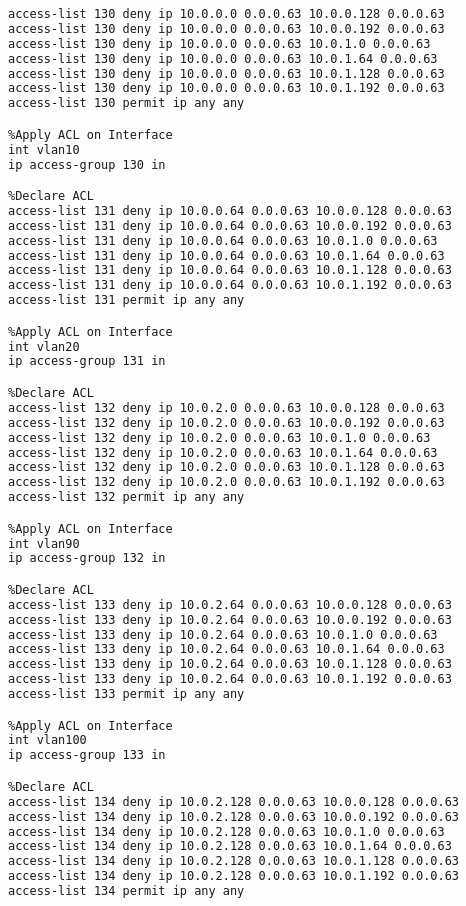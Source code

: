 \begin{lstlisting}[language=Bash, caption={Configuración ACLs Switches Distribución}]
%Declare ACL
access-list 130 deny ip 10.0.0.0 0.0.0.63 10.0.0.128 0.0.0.63
access-list 130 deny ip 10.0.0.0 0.0.0.63 10.0.0.192 0.0.0.63
access-list 130 deny ip 10.0.0.0 0.0.0.63 10.0.1.0 0.0.0.63
access-list 130 deny ip 10.0.0.0 0.0.0.63 10.0.1.64 0.0.0.63
access-list 130 deny ip 10.0.0.0 0.0.0.63 10.0.1.128 0.0.0.63
access-list 130 deny ip 10.0.0.0 0.0.0.63 10.0.1.192 0.0.0.63
access-list 130 permit ip any any

%Apply ACL on Interface
int vlan10
ip access-group 130 in

%Declare ACL
access-list 131 deny ip 10.0.0.64 0.0.0.63 10.0.0.128 0.0.0.63
access-list 131 deny ip 10.0.0.64 0.0.0.63 10.0.0.192 0.0.0.63
access-list 131 deny ip 10.0.0.64 0.0.0.63 10.0.1.0 0.0.0.63
access-list 131 deny ip 10.0.0.64 0.0.0.63 10.0.1.64 0.0.0.63
access-list 131 deny ip 10.0.0.64 0.0.0.63 10.0.1.128 0.0.0.63
access-list 131 deny ip 10.0.0.64 0.0.0.63 10.0.1.192 0.0.0.63
access-list 131 permit ip any any

%Apply ACL on Interface
int vlan20
ip access-group 131 in

%Declare ACL
access-list 132 deny ip 10.0.2.0 0.0.0.63 10.0.0.128 0.0.0.63
access-list 132 deny ip 10.0.2.0 0.0.0.63 10.0.0.192 0.0.0.63
access-list 132 deny ip 10.0.2.0 0.0.0.63 10.0.1.0 0.0.0.63
access-list 132 deny ip 10.0.2.0 0.0.0.63 10.0.1.64 0.0.0.63
access-list 132 deny ip 10.0.2.0 0.0.0.63 10.0.1.128 0.0.0.63
access-list 132 deny ip 10.0.2.0 0.0.0.63 10.0.1.192 0.0.0.63
access-list 132 permit ip any any

%Apply ACL on Interface
int vlan90
ip access-group 132 in

%Declare ACL
access-list 133 deny ip 10.0.2.64 0.0.0.63 10.0.0.128 0.0.0.63
access-list 133 deny ip 10.0.2.64 0.0.0.63 10.0.0.192 0.0.0.63
access-list 133 deny ip 10.0.2.64 0.0.0.63 10.0.1.0 0.0.0.63
access-list 133 deny ip 10.0.2.64 0.0.0.63 10.0.1.64 0.0.0.63
access-list 133 deny ip 10.0.2.64 0.0.0.63 10.0.1.128 0.0.0.63
access-list 133 deny ip 10.0.2.64 0.0.0.63 10.0.1.192 0.0.0.63
access-list 133 permit ip any any

%Apply ACL on Interface
int vlan100
ip access-group 133 in

%Declare ACL
access-list 134 deny ip 10.0.2.128 0.0.0.63 10.0.0.128 0.0.0.63
access-list 134 deny ip 10.0.2.128 0.0.0.63 10.0.0.192 0.0.0.63
access-list 134 deny ip 10.0.2.128 0.0.0.63 10.0.1.0 0.0.0.63
access-list 134 deny ip 10.0.2.128 0.0.0.63 10.0.1.64 0.0.0.63
access-list 134 deny ip 10.0.2.128 0.0.0.63 10.0.1.128 0.0.0.63
access-list 134 deny ip 10.0.2.128 0.0.0.63 10.0.1.192 0.0.0.63
access-list 134 permit ip any any


\end{lstlisting}
